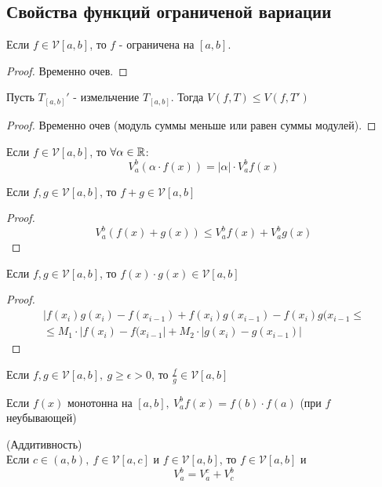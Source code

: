 \subsection{Свойства функций ограниченой вариации}
\begin{numtheorem}
    Если $f\in \mathcal{V}[a,b]$, то $f$ - ограничена на $[a,b]$.
\end{numtheorem}
\begin{proof}
    Временно очев.
\end{proof}
\begin{numtheorem}
    Пусть $T_{[a,b]}'$ - измельчение $T_{[a,b]}$. Тогда $V(f, T)\leq V(f, T')$
\end{numtheorem} 
\begin{proof}
    Временно очев (модуль суммы меньше или равен суммы модулей).
\end{proof} 
\begin{numtheorem}
    Если $f\in \mathcal{V} [a,b]$, то $\forall \alpha\in \mathbb{R}$:
    \[V_a^b(\alpha\cdot f(x))=|\alpha|\cdot V_a^b f(x)\] 
\end{numtheorem} 
\begin{numtheorem}
    Если $f,g\in \mathcal{V}[a,b]$, то $f+g\in \mathcal{V}[a,b]$
\end{numtheorem} 
\begin{proof}
    \[V_a^b(f(x)+g(x))\leq V_a^b f(x)+V_a^b g(x)\]
\end{proof} 
\begin{numtheorem}
    Если $f,g\in \mathcal{V}[a,b]$, то $f(x)\cdot g(x)\in \mathcal{V}[a,b]$
\end{numtheorem} 
\begin{proof}
    \begin{multline*}
        |f(x_i)g(x_i)-f(x_{i-1})+f(x_i)g(x_{i-1})-f(x_i)g(x_{i-1}\leq\\
        \leq M_1\cdot |f(x_i)-f(x_{i-1}|+M_2\cdot |g(x_i)-g(x_{i-1})|
    \end{multline*}
\end{proof} 
\begin{numtheorem}
    Если $f,g\in \mathcal{V}[a,b],\ g\geq \epsilon>0$, то $\frac{f}{g}\in \mathcal{V}[a,b]$
\end{numtheorem} 
\begin{numtheorem}
    Если $f(x)$ монотонна на $[a,b],\ V_a^b f(x)=f(b)\cdot f(a)$ (при $f$ неубывающей) 
\end{numtheorem}
\begin{numtheorem} (Аддитивность)\\
    Если $c\in (a,b),\ f\in \mathcal{V}[a,c]$ и $f\in \mathcal{V}[a,b]$, то $f\in \mathcal{V}[a,b]$ и 
    \[V_a^b=V_a^c+V_c^b\]
\end{numtheorem} 
